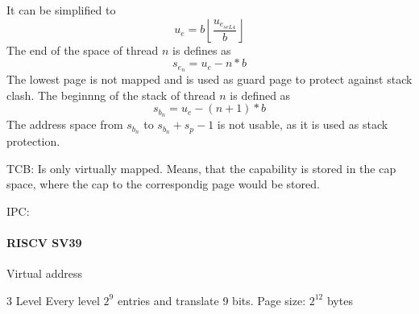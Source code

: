 It can be simplified to
\begin{equation}
    u_e = b \left \lfloor \frac{u_{e_{seL4}}}{b} \right \rfloor
\end{equation}
The end of the space of thread $n$ is defines as
\begin{equation}
    s_{e_n} = u_e - n * b
\end{equation}
The lowest page is not mapped and is used as guard page to protect against stack clash.
The beginnng of the stack of thread $n$ is defined as
\begin{equation}
    s_{b_n} = u_e - (n + 1) * b
\end{equation}
The address space from $s_{b_n}$ to $s_{b_n} + s_p - 1$ is not usable, as it is used
as stack protection.


\begin{figure}
    \label{fig:thread_space}
\end{figure}

TCB: Is only virtually mapped.
Means, that the capability is stored in the cap space, where the cap to the correspondig
page would be stored.

IPC: 


\paragraph{RISCV SV39}
Virtual address

3 Level
Every level $2^9$ entries and translate 9 bits.
Page size: $2^12$ bytes

